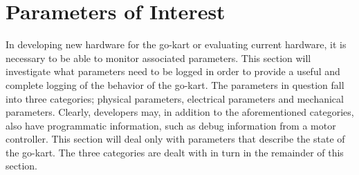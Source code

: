 
\section{Parameters of Interest}
\label{sec:parameters}
In developing new hardware for the go-kart or evaluating current hardware, it is necessary to be able to monitor associated parameters.
This section will investigate what parameters need to be logged in order to provide a useful and complete logging of the behavior of the go-kart.
The parameters in question fall into three categories; physical parameters, electrical parameters and mechanical parameters.
Clearly, developers may, in addition to the aforementioned categories, also have programmatic information, such as debug information from a motor controller.
This section will deal only with parameters that describe the state of the go-kart.
The three categories are dealt with in turn in the remainder of this section.
